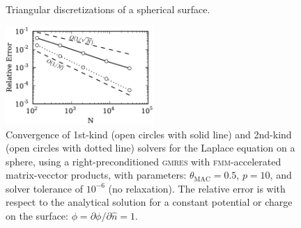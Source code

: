 \documentclass[final,leqno,]{siamltex1213}
\newcommand{\fmm}{\textsc{fmm}\xspace}
\newcommand{\gmres}{\textsc{gmres}\xspace}
\newcommand{\partialdi}[2]{\partial #1 / \partial #2}
\newcommand{\nhat}{\hat{n}}
\begin{document}
\begin{figure}%
\begin{center}
	\qquad
	\caption{Triangular discretizations of a spherical surface.}
	\label{fig:glob_spheres}
\end{center}
\end{figure}
%
\begin{figure}[t]
\begin{center}
	\includegraphics[natwidth=3in,natheight=2in,width=0.5\textwidth]{LaplaceConvergence.pdf}
	\caption{Convergence of 1st-kind (open circles with solid line) and 2nd-kind (open circles with dotted line) solvers for the Laplace equation on a sphere, using a right-preconditioned \gmres with \fmm-accelerated matrix-vecctor products, with parameters: $\theta_{\text{MAC}} = 0.5$, $p=10$, and solver tolerance of $10^{-6}$ (no relaxation). The relative error is with respect to the analytical solution for a constant potential or charge on the surface: $\phi = \partialdi{\phi}{\nhat} = 1$.}
	\label{fig:laplaceconvergence}
\end{center}
\end{figure}
\end{document}
